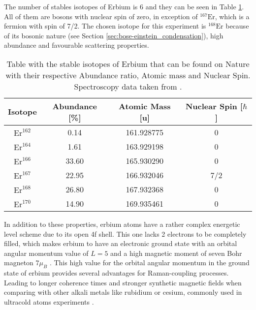 The number of stables isotopes of Erbium is 6 and they can be seen in Table \ref{tab:Isotopes_Erbium}. All of them are bosons with nuclear spin of zero, in exception of $^{\text{167}}\text{Er}$, which is a fermion with spin of 7/2. The chosen isotope for this experiment is $^{\text{168}}\text{Er}$ because of its bosonic nature (see Section \ref{sec:bose-einstein_condensation}), high abundance and favourable scattering properties.

\begin{table}[htbp] \centering
	\begin{tabular}{@{}c|c|c|c@{}}\hline
		Isotope                  & Abundance [\%]          & Atomic Mass [u] & Nuclear Spin [$\hbar$] \\ \hline\hline
		$\text{Er}^{\text{162}}$ &  0.14                   & 161.928775      & 0   \\
		$\text{Er}^{\text{164}}$ &  1.61                   & 163.929198      & 0   \\ 
		$\text{Er}^{\text{166}}$ & 33.60                   & 165.930290      & 0   \\
		$\text{Er}^{\text{167}}$ & 22.95                   & 166.932046      & 7/2   \\
		$\text{Er}^{\text{168}}$ & 26.80                   & 167.932368      & 0   \\  
		$\text{Er}^{\text{170}}$ & 14.90                   & 169.935461      & 0   \\  \hline
	\end{tabular}
	\caption[Table with the stable isotopes of Erbium]{Table with the stable isotopes of Erbium that can be found on Nature with their respective Abundance ratio, Atomic mass and Nuclear Spin. Spectroscopy data taken from \cite{sansonetti2005handbook}.}\label{tab:Isotopes_Erbium}
\end{table}

In addition to these properties, erbium atoms have a rather complex energetic level scheme due to its open 4f shell. This one lacks 2 electrons to be completely filled, which makes erbium to have an electronic ground state with an orbital angular momentum value of $L = 5$ and a high magnetic moment of seven Bohr magneton $7\mu_B$ \cite{ban2005laser}. This high value for the orbital angular momentum in the ground state of erbium provides several advantages for Raman-coupling processes. Leading to longer coherence times and stronger synthetic magnetic fields when comparing with other alkali metals like rubidium or cesium, commonly used in ultracold atoms experiments  \cite{cui2013synthetic}.


